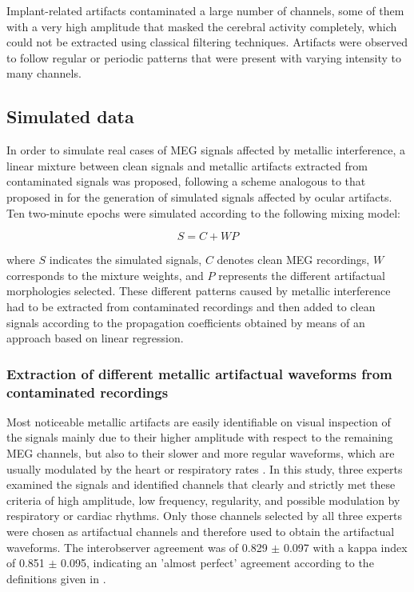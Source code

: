 Implant-related artifacts contaminated a large number of channels, some of them with a very high amplitude that masked the cerebral activity completely, which could not be extracted using classical filtering techniques. Artifacts were observed to follow regular or periodic patterns that were present with varying intensity to many channels.

\subsection{Simulated data}

In order to simulate real cases of MEG signals affected by metallic interference, a linear mixture between clean signals and metallic artifacts extracted from contaminated signals was proposed, following a scheme analogous to that proposed in \citep{Romero2008} for the generation of simulated signals affected by ocular artifacts. Ten two-minute epochs were simulated according to the following mixing model:

\begin{equation} \label{eq:1-1} 
S=C+WP
\end{equation}

where $S$ indicates the simulated signals, $C$ denotes clean MEG recordings, $W$ corresponds to the mixture weights, and $P$ represents the different artifactual morphologies selected. These different patterns caused by metallic interference had to be extracted from contaminated recordings and then added to clean signals according to the propagation coefficients obtained by means of an approach based on linear regression.

\subsubsection*{Extraction of different metallic artifactual waveforms from contaminated recordings}

Most noticeable metallic artifacts are easily identifiable on visual inspection of the signals mainly due to their higher amplitude with respect to the remaining MEG channels, but also to their slower and more regular waveforms, which are usually modulated by the heart or respiratory rates \citep{Hillebrand2013}. In this study, three experts examined the signals and identified channels that clearly and strictly met these criteria of high amplitude, low frequency, regularity, and possible modulation by respiratory or cardiac rhythms. Only those channels selected by all three experts were chosen as artifactual channels and therefore used to obtain the artifactual waveforms. The interobserver agreement was of 0.829 $\pm$ 0.097 with a kappa index of 0.851 $\pm$ 0.095, indicating an 'almost perfect' agreement according to the definitions given in \citep{Viera2005}.

